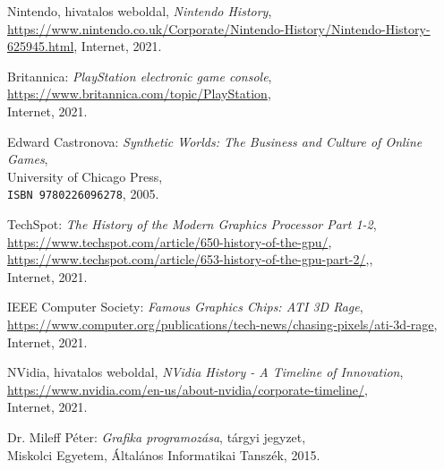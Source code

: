 \begin{thebibliography}{x}
	Nintendo, hivatalos weboldal, \emph{Nintendo History}, \\
	\url{https://www.nintendo.co.uk/Corporate/Nintendo-History/Nintendo-History-625945.html},
	Internet, 2021.
	
	
	Britannica: \emph{PlayStation electronic game console}, \\
	\url{https://www.britannica.com/topic/PlayStation}, \\
	Internet, 2021.
	
	Edward Castronova: \emph{Synthetic Worlds: The Business and Culture of Online Games}, \\
	University of Chicago Press, \\
	\texttt{ISBN 9780226096278}, 2005.	
	
	TechSpot: \emph{The History of the Modern Graphics Processor Part 1-2}, \\
	\url{https://www.techspot.com/article/650-history-of-the-gpu/}, \\
	\url{https://www.techspot.com/article/653-history-of-the-gpu-part-2/},, \\
	Internet, 2021.
	
	IEEE Computer Society: \emph{Famous Graphics Chips: ATI 3D Rage}, \\
	\url{https://www.computer.org/publications/tech-news/chasing-pixels/ati-3d-rage}, \\
	Internet, 2021.
	
	NVidia, hivatalos weboldal, \emph{NVidia History - A Timeline of Innovation}, \\
	\url{https://www.nvidia.com/en-us/about-nvidia/corporate-timeline/}, \\
	Internet, 2021.
	
	Dr. Mileff Péter: \emph{Grafika programozása}, tárgyi jegyzet, \\
	Miskolci Egyetem, Általános Informatikai Tanszék, 2015.
	

\end{thebibliography}
